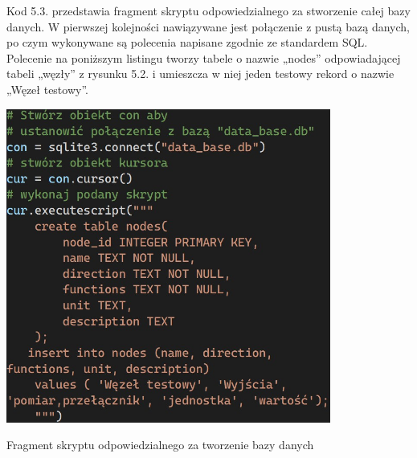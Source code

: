 \documentclass[12pt, twoside, openany]{mwrep}
\begin{document}
Kod 5.3. przedstawia fragment skryptu odpowiedzialnego za stworzenie całej bazy danych. W pierwszej kolejności nawiązywane jest połączenie z pustą bazą danych, po czym wykonywane są polecenia napisane zgodnie ze standardem SQL. Polecenie na poniższym listingu tworzy tabele o nazwie „nodes” odpowiadającej tabeli „węzły” z rysunku 5.2. i umieszcza w niej jeden testowy rekord o nazwie „Węzeł testowy”.
\par

\begin{algorithm}[H]
\centering
\includegraphics[width=0.8\textwidth]{kod_migracja}
\caption{Fragment skryptu odpowiedzialnego za tworzenie bazy danych}
\end{algorithm}

\end{document}
